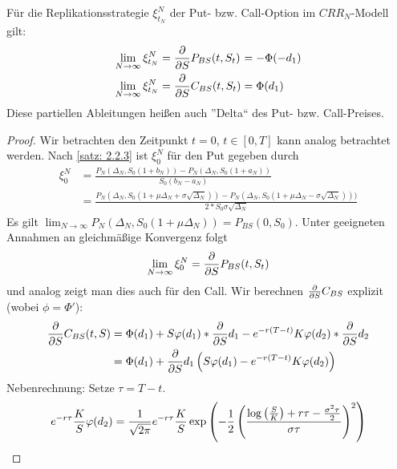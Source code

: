 \begin{theorem}
	Für die Replikationsstrategie $\xi_{t_N}^N$ der Put- bzw. Call-Option im $CRR_N$-Modell gilt:
	\begin{equation*}
		\begin{alignedat}{2}
			\lim_{N \to \infty} \xi_{t_N}^N &= \frac{\partial}{\partial S } P_{BS}(t,S_t) &&= -\Phi(-d_1) \\
			\lim_{N \to \infty} \xi_{t_N}^N &= \frac{\partial}{\partial S } C_{BS}(t,S_t) &&= \Phi(d_1)
		\end{alignedat}
	\end{equation*}
	Diese partiellen Ableitungen heißen auch ''Delta`` des Put- bzw. Call-Preises.
\end{theorem}
\begin{proof}
	Wir betrachten den Zeitpunkt $t = 0$, $t \in [0,T]$ kann analog betrachtet werden.
	Nach \cref{satz: 2.2.3} ist $\xi_0^N$ für den Put gegeben durch
	\begin{equation*}
		\begin{aligned}
			\xi_0^N &= \frac{P_N(\Delta_N, S_0(1+b_N)) - P_N(\Delta_N, S_0 (1+a_N))}{S_0 (b_N - a_N)} \\
			&= \frac{P_N(\Delta_N, S_0(1 + \mu \Delta_N + \sigma \sqrt{\Delta_N})) - P_N (\Delta_N, S_0 (1+ \mu \Delta_N - \sigma \sqrt{\Delta_N})))}{2 * S_0 \sigma \sqrt{\Delta_N}}
		\end{aligned}
	\end{equation*}
	Es gilt $\lim_{N \to \infty} P_N(\Delta_N, S_0 (1 + \mu \Delta_N)) = P_{BS}(0,S_0)$. Unter geeigneten Annahmen an gleichmäßige Konvergenz folgt 
	\begin{equation*}
		\lim_{N \to \infty} \xi_0^N = \frac{\partial}{\partial S } P_{BS} (t, S_t)
	\end{equation*}
	und analog zeigt man dies auch für den Call.
	Wir berechnen $\frac{\partial}{\partial S } C_{BS}$ explizit (wobei $\phi = \Phi'$):
	\begin{align*}
		\frac{\partial}{\partial S } C_{BS}(t,S) &= \Phi(d_1) + S \varphi(d_1) * \frac{\partial}{\partial S } d_1 - e^{-r(T-t)} K \varphi(d_2) * \frac{\partial}{\partial S } d_2 \\
		&= \Phi(d_1) + \frac{\partial}{\partial S } d_1 \left( S \varphi(d_1) - e^{-r(T-t)} K \varphi(d_2) \right)
	\end{align*}
	Nebenrechnung: Setze $\tau = T - t$.
	\begin{align*}
		e^{-r \tau} \frac{K}{S} \phi(d_2) &= \frac{1}{\sqrt{2\pi}} e^{-r \tau} \frac{K}{S} \exp \brackets{-\frac{1}{2} \brackets{\frac{\log\brackets{\frac{S}{K}} + r \tau - \frac{\sigma^2 \tau}{2}}{\sigma \tau}}^2} \\

\end{align*}
\end{proof}

